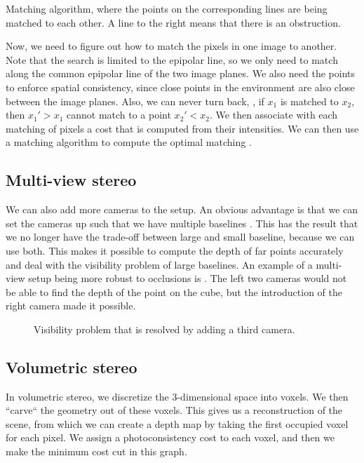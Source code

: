 \begin{marginfigure}
    \centering
    \caption{Matching algorithm, where the points on the corresponding lines are
      being matched to each other. A line to the right means that there is an
      obstruction.}
    \label{fig:matching-algorithm}
\end{marginfigure}

Now, we need to figure out how to match the pixels in one image to another.
Note that the search is limited to the epipolar line, so we only need to match
along the common epipolar line of the two image planes. We also need the points
to enforce spatial consistency, since close points in the environment are also
close between the image planes. Also, we can never turn back, \ie, if $x_1$ is
matched to $x_2$, then $x_1' > x_1$ cannot match to a point $x_2' < x_2$. We
then associate with each matching of pixels a cost that is computed from their
intensities. We can then use a matching algorithm to compute the optimal
matching \citep{baker1981depth}.

\subsection{Multi-view stereo}

We can also add more cameras to the setup. An obvious advantage is that we can
set the cameras up such that we have multiple baselines
\citep{okutomi1993multiple}. This has the result that we no longer have the
trade-off between large and small baseline, because we can use both. This makes
it possible to compute the depth of far points accurately and deal with the
visibility problem of large baselines. An example of a multi-view setup being
more robust to occlusions is . The left two
cameras would not be able to find the depth of the point on the cube, but the
introduction of the right camera made it possible.

\begin{figure}
    \centering
    \caption{Visibility problem that is resolved by adding a third camera.}
    \label{fig:visibility-problem}
\end{figure}

\subsection{Volumetric stereo}

In volumetric stereo, we discretize the 3-dimensional space into
voxels. We then ``carve``
the geometry out of these voxels. This gives us a reconstruction of the scene,
from which we can create a depth map by taking the first occupied voxel for
each pixel. We assign a photoconsistency cost to each voxel, and then we make
the minimum cost cut in this graph.

